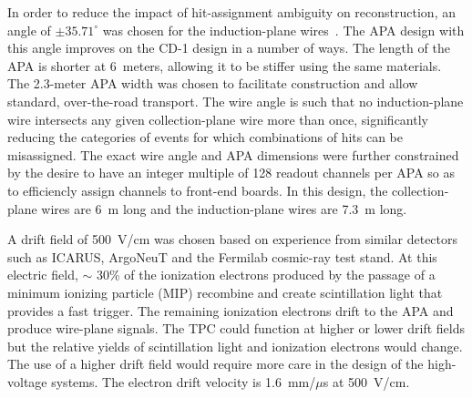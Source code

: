 In order to reduce the impact of hit-assignment ambiguity on
reconstruction, an angle of $\pm35.71^\circ$ was chosen for the
induction-plane wires~\cite{docdb-9374,docdb8981,docdb9886}.  The APA
design with this angle improves on the CD-1 design in a number of
ways.  The length of the APA is shorter at 6~meters, allowing it to be
stiffer using the same materials.  The 2.3-meter APA width was chosen
to facilitate construction and allow standard, over-the-road
transport. The wire angle is such that no induction-plane wire
intersects any given collection-plane wire more than once,
significantly reducing the categories of events for which combinations
of hits can be misassigned.  The exact wire angle and APA dimensions
were further constrained by the desire to have an integer multiple of
128 readout channels per APA so as to efficiencly assign channels to
front-end boards.  In this design, the collection-plane wires are 6~m
long and the induction-plane wires are 7.3~m long.


A drift field of 500~V/cm was chosen based on experience from similar
detectors such as ICARUS, ArgoNeuT and the Fermilab cosmic-ray test
stand. At this electric field, $\sim$ 30\% of the ionization electrons
produced by the passage of a minimum ionizing particle (MIP) recombine
and create scintillation light that provides a fast trigger. The
remaining ionization electrons drift to the APA and produce wire-plane
signals. The TPC could function at higher or lower drift fields but
the relative yields of scintillation light and ionization electrons
would change. The use of a higher drift field would require more care
in the design of the high-voltage systems. The electron drift velocity
is 1.6~mm/$\mu$s at 500~V/cm.

